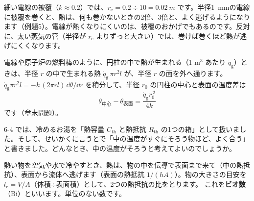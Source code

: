 \noindent 細い電線の被覆（$k\approx0.2$）では、$r_{\mathrm c}=0.2\div10=\qty{0.02}{m}$ です。半径\qty{1}{mm}の電線に被覆を巻くと、熱は、何も巻かないときの2倍、3倍と、よく逃げるようになります（例題5）。電線が熱くなりにくいのは、被覆のおかげでもあるのです。反対に、太い蒸気の管（半径が $r_{\mathrm c}$ よりずっと大きい）では、巻けば巻くほど熱が逃げにくくなります。

電線や原子炉の燃料棒のように、円柱の中で熱が生まれる（1 m$^3$ あたり $\dot q_{\mathrm g}$）ときは、半径 $r$ の中で生まれる熱 $\dot q_{\mathrm g}\,\pi r^2l$ が、半径 $r$ の面を外へ通ります。$\dot q_{\mathrm g}\pi r^2l=-k\,(2\pi rl)\,\dd\theta/\dd r$ を積分して、半径 $r_0$ の円柱の中心と表面の温度差は
\[\theta_{\text{中心}}-\theta_{\text{表面}}=\frac{\dot q_{\mathrm g}r_0^{\,2}}{4k}\]
です（章末問題）。

\label{ph:熱-11:sec8}
6-4 では、冷めるお湯を「熱容量 $C_{\mathrm{th}}$ と熱抵抗 $R_{\mathrm{th}}$ の1つの箱」として扱いました。そして、せいかくに言うとで「中の温度がすぐにそろう物ほど、よく合う」と書きました。どんなとき、中の温度がそろうと考えてよいのでしょうか。

熱い物を空気や水で冷やすとき、熱は、物の中を伝導で表面まで来て（中の熱抵抗）、表面から流体へ逃げます（表面の熱抵抗 $1/(hA)$）。物の大きさの目安を $l_{\mathrm c}=V/A$（体積÷表面積）として、2つの熱抵抗の比をとります。
これを\textbf{ビオ数}（Bi）といいます。単位のない数です。

